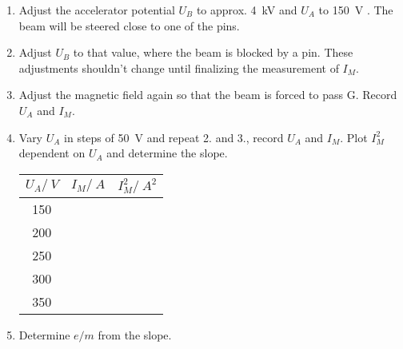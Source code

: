 \documentclass{tudphygp_eng}
\begin{document}
  \begin{enumerate}
    \item Adjust the accelerator potential $U_B$ to approx. \SI{4}{kV} and $U_A$ to \SI{150}{V} . The beam will be steered close to one of the pins.
    \item Adjust $U_B$ to that value, where the beam is blocked by a pin.
      These adjustments shouldn't change until finalizing the measurement of $I_M$.
    \item Adjust the magnetic field again so that the beam is forced to pass G. Record $U_A$ and $I_M$.
    \item Vary $U_A$ in steps of \SI{50}{V} and repeat 2. and 3., record $U_A$ and $I_M$. Plot $I_M^2$ 
    dependent on $U_A$ and determine the slope.\\[1em]
    \begin{tabular}{|c|c|c|}\hline
      $U_A/\SI{}{V}$ & \hspace{10pt}$I_M/\SI{}{A}$\hspace{10pt} & \hspace{10pt}$I_M^2/\SI{}{A^2}$\hspace{10pt} \\\hline
      150 & &\\
      200 & &\\
      250 & &\\
      300 & &\\
      350 & &\\\hline
    \end{tabular}
    \item Determine $e/m$ from the slope.
  \end{enumerate}
\end{document}
